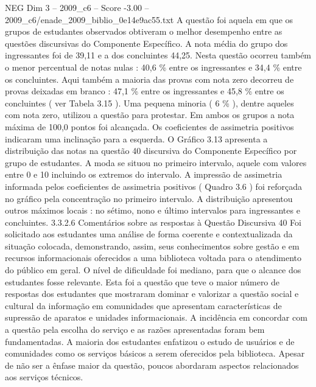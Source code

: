 \begin{textsample}{NEG Dim 3 – 2009\_c6 – Score -3.00 – 2009\_c6/enade\_2009\_biblio\_0e14e9ac55.txt}
A questão foi aquela em que os grupos de estudantes observados obtiveram o melhor desempenho entre as questões discursivas do Componente Específico.
A nota média do grupo dos ingressantes foi de 39,11 e a dos concluintes 44,25.
Nesta questão ocorreu também o menor percentual de notas nulas : 40,6 \% entre os ingressantes e 34,4 \% entre os concluintes.
Aqui também a maioria das provas com nota zero decorreu de provas deixadas em branco : 47,1 \% entre os ingressantes e 45,8 \% entre os concluintes ( ver Tabela 3.15 ).
Uma pequena minoria ( 6 \% ), dentre aqueles com nota zero, utilizou a questão para protestar.
Em ambos os grupos a nota máxima de 100,0 pontos foi alcançada.
Os coeficientes de assimetria positivos indicaram uma inclinação para a esquerda.
O Gráfico 3.13 apresenta a distribuição das notas na questão 40 discursiva do Componente Específico por grupo de estudantes.
A moda se situou no primeiro intervalo, aquele com valores entre 0 e 10 incluindo os extremos do intervalo.
A impressão de assimetria informada pelos coeficientes de assimetria positivos ( Quadro 3.6 ) foi reforçada no gráfico pela concentração no primeiro intervalo.
A distribuição apresentou outros máximos locais : no sétimo, nono e último intervalos para ingressantes e concluintes. 3.3.2.6 Comentários sobre as respostas à Questão Discursiva 40 Foi solicitado aos estudantes uma análise de forma coerente e contextualizada da situação colocada, demonstrando, assim, seus conhecimentos sobre gestão e em recursos informacionais oferecidos a uma biblioteca voltada para o atendimento do público em geral.
O nível de dificuldade foi mediano, para que o alcance dos estudantes fosse relevante.
Esta foi a questão que teve o maior número de respostas dos estudantes que mostraram dominar e valorizar a questão social e cultural da informação em comunidades que apresentam características de supressão de aparatos e unidades informacionais.
A incidência em concordar com a questão pela escolha do serviço e as razões apresentadas foram bem fundamentadas.
A maioria dos estudantes enfatizou o estudo de usuários e de comunidades como os serviços básicos a serem oferecidos pela biblioteca.
Apesar de não ser a ênfase maior da questão, poucos abordaram aspectos relacionados aos serviços técnicos.

\end{textsample}
